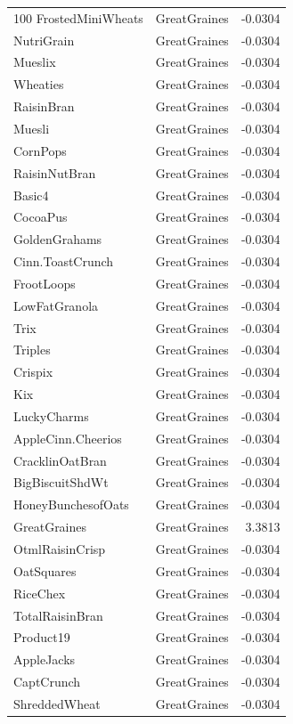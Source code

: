 \begin{longtable}{llr}
100%
FrostedMiniWheats & GreatGraines & -0.0304 \\
NutriGrain & GreatGraines & -0.0304 \\
Mueslix & GreatGraines & -0.0304 \\
Wheaties & GreatGraines & -0.0304 \\
RaisinBran & GreatGraines & -0.0304 \\
Muesli & GreatGraines & -0.0304 \\
CornPops & GreatGraines & -0.0304 \\
RaisinNutBran & GreatGraines & -0.0304 \\
Basic4 & GreatGraines & -0.0304 \\
CocoaPus & GreatGraines & -0.0304 \\
GoldenGrahams & GreatGraines & -0.0304 \\
Cinn.ToastCrunch & GreatGraines & -0.0304 \\
FrootLoops & GreatGraines & -0.0304 \\
LowFatGranola & GreatGraines & -0.0304 \\
Trix & GreatGraines & -0.0304 \\
Triples & GreatGraines & -0.0304 \\
Crispix & GreatGraines & -0.0304 \\
Kix & GreatGraines & -0.0304 \\
LuckyCharms & GreatGraines & -0.0304 \\
AppleCinn.Cheerios & GreatGraines & -0.0304 \\
CracklinOatBran & GreatGraines & -0.0304 \\
BigBiscuitShdWt & GreatGraines & -0.0304 \\
HoneyBunchesofOats & GreatGraines & -0.0304 \\
GreatGraines & GreatGraines & 3.3813 \\
OtmlRaisinCrisp & GreatGraines & -0.0304 \\
OatSquares & GreatGraines & -0.0304 \\
RiceChex & GreatGraines & -0.0304 \\
TotalRaisinBran & GreatGraines & -0.0304 \\
Product19 & GreatGraines & -0.0304 \\
AppleJacks & GreatGraines & -0.0304 \\
CaptCrunch & GreatGraines & -0.0304 \\
ShreddedWheat & GreatGraines & -0.0304 \\

\end{longtable}
